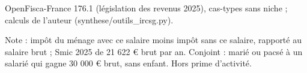 OpenFisca-France 176.1 (législation des revenus 2025), cas-types sans niche ; calculs de l'auteur (synthese/outils\_ircsg.py).\par Note : impôt du ménage avec ce salaire moins impôt sans ce salaire, rapporté au salaire brut ; Smic 2025 de 21 622 \euro{} brut par an. Conjoint : marié ou pacsé à un salarié qui gagne 30 000 \euro{} brut, sans enfant. Hors prime d'activité.
